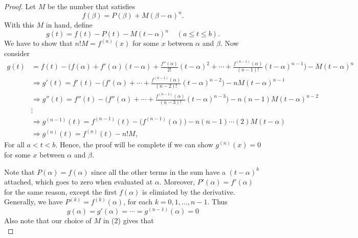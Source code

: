 \documentclass[12pt]{article}
\theoremstyle{definition}
\theoremstyle{definition}
\begin{document}
    \begin{proof}
       Let $M$ be the number that satisfies
       \begin{equation}
           f(\beta)=P(\beta)+M(\beta-\alpha)^n.
       \end{equation}
       With this $M$ in hand, define 
       \begin{equation}
           g(t)=f(t)-P(t)-M(t-\alpha)^n\;\;\;\;(a\leq t\leq b).
       \end{equation}
       We have to show that $n!M=f^{(n)}(x)$ for some $x$ between $\alpha$ and
       $\beta$. Now consider
       \begin{align*}
           g(t)&=f(t)-\big(f(\alpha)+f'(\alpha)(t-\alpha)+\frac{f''(\alpha)}{2!}(t-\alpha)^2+\cdots
           +\frac{f^{(n-1)}(\alpha)}{(n-1)!}(t-\alpha)^{n-1}\big)-M(t-\alpha)^n
           \\
           &\Rightarrow
           g'(t)=f'(t)-\big(f'(\alpha)+\cdots
           +\frac{f^{(n-1)}(\alpha)}{(n-2)!}(t-\alpha)^{n-2}\big)-nM(t-\alpha)^{n-1}
           \\
           &\Rightarrow
           g''(t)=f''(t)-\big(f''(\alpha)+\cdots
           +\frac{f^{(n-1)}(\alpha)}{(n-3)!}(t-\alpha)^{n-3}\big)-n(n-1)M(t-\alpha)^{n-2}
           \\
           &\vdots \\
           &\Rightarrow
           g^{(n-1)}(t)=f^{(n-1)}(t)-\big(f^{(n-1)}(\alpha)\big)-n(n-1)\cdots(2)M(t-\alpha)
           \\
           &\Rightarrow g^{(n)}(t)=f^{(n)}(t)-n!M,
       \end{align*}
       For all $a<t<b$. Hence, the proof will be complete if we can show
       $g^{(n)}(x)=0$ for some $x$ between $\alpha$ and $\beta$.\par\hspace{4mm} Note that
       $P(\alpha)=f(\alpha)$ since all the other terms in the sum have
       a $(t-\alpha)^k$ attached, which goes to zero when evaluated at
       $\alpha$. Moreover, $P'(\alpha)=f'(\alpha)$ for the same reason, except
       the first $f(\alpha)$ is elimiated by the derivative. Generally, we have
       $P^{(k)}=f^{(k)}(\alpha)$, for each $k=0, 1, \dots,n-1$. Thus
       \begin{equation*}
           g(\alpha)=g'(\alpha)=\cdots=g^{(n-1)}(\alpha)=0
       \end{equation*}
       Also note that our choice of $M$ in (2) gives that 
       \begin{equation*}

\end{equation*}
\end{proof}
\end{document}
